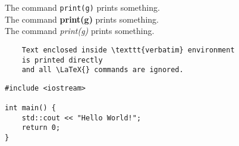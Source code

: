 \documentclass{article}
\begin{document}
The command \verb|print(g)| prints something.\\

The command \textbf{print(g)} prints something.\\

The command \emph{print(g)} prints something.\\


\begin{verbatim}
	Text enclosed inside \texttt{verbatim} environment 
	is printed directly 
	and all \LaTeX{} commands are ignored.
\end{verbatim}



\begin{lstlisting}
#include <iostream>

int main() { 
	std::cout << "Hello World!";
	return 0;
}
	
\end{lstlisting}
\end{document}
